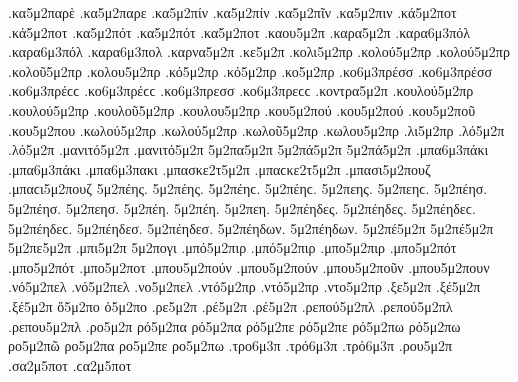 {.κα5μ2παρὲ 
.κα5μ2παρε 
.κα5μ2πίν .κα5μ2πίν   %
.κα5μ2πῖν 
.κα5μ2πιν 
.κά5μ2ποτ .κά5μ2ποτ   %
.κα5μ2πότ .κα5μ2πότ 
.κα5μ2ποτ 
.καου5μ2π   %
.καρα5μ2π   %
.καρα6μ3πόλ .καρα6μ3πόλ   %
.καρα6μ3πολ 
.καρνα5μ2π   %
.κε5μ2π   %
.κολι5μ2πρ   %
.κολού5μ2πρ .κολού5μ2πρ   %
.κολοῦ5μ2πρ 
.κολου5μ2πρ 
.κό5μ2πρ .κό5μ2πρ   %
.κο5μ2πρ 
.κο6μ3πρέσσ .κο6μ3πρέσσ .κο6μ3πρέϲϲ .κο6μ3πρέϲϲ   %
.κο6μ3πρεσσ .κο6μ3πρεϲϲ 
.κοντρα5μ2π   %
.κουλού5μ2πρ .κουλού5μ2πρ   %
.κουλοῦ5μ2πρ 
.κουλου5μ2πρ 
.κου5μ2πού .κου5μ2πού   %
.κου5μ2ποῦ 
.κου5μ2που 
.κωλού5μ2πρ .κωλού5μ2πρ   %
.κωλοῦ5μ2πρ 
.κωλου5μ2πρ 
.λι5μ2πρ   %
.λό5μ2π .λό5μ2π   %
.μανιτό5μ2π .μανιτό5μ2π   %
5μ2πα5μ2π   %
5μ2πά5μ2π 5μ2πά5μ2π   %
.μπα6μ3πάκι .μπα6μ3πάκι   %
.μπα6μ3πακι 
.μπασκε2τ5μ2π .μπαϲκε2τ5μ2π   %
.μπασι5μ2πουζ .μπαϲι5μ2πουζ   %
5μ2πέης. 5μ2πέης. 5μ2πέηϲ. 5μ2πέηϲ.   %
5μ2πεης. 5μ2πεηϲ. 
5μ2πέησ. 5μ2πέησ. 
5μ2πεησ. 
5μ2πέη. 5μ2πέη. 
5μ2πεη. 
5μ2πέηδες. 5μ2πέηδες. 5μ2πέηδεϲ. 5μ2πέηδεϲ. 
5μ2πέηδεσ. 5μ2πέηδεσ. 
5μ2πέηδων. 5μ2πέηδων. 
5μ2πέ5μ2π 5μ2πέ5μ2π   %
5μ2πε5μ2π 
.μπι5μ2π   %
5μ2πογι   %
.μπό5μ2πιρ .μπό5μ2πιρ   %
.μπο5μ2πιρ   %
.μπο5μ2πότ .μπο5μ2πότ   %
.μπο5μ2ποτ 
.μπου5μ2πούν .μπου5μ2πούν   %
.μπου5μ2ποῦν 
.μπου5μ2πουν 
.νό5μ2πελ .νό5μ2πελ   %
.νο5μ2πελ 
.ντό5μ2πρ .ντό5μ2πρ   %
.ντο5μ2πρ 
.ξε5μ2π   %
.ξέ5μ2π .ξέ5μ2π 
ὄ5μ2πο   %
ὀ5μ2πο 
.ρε5μ2π   %
.ρέ5μ2π .ρέ5μ2π   %
.ρεπού5μ2πλ .ρεπού5μ2πλ   %
.ρεπου5μ2πλ   %
.ρο5μ2π   %
ρό5μ2πα ρό5μ2πα   %
ρό5μ2πε ρό5μ2πε 
ρό5μ2πω ρό5μ2πω 
ρο5μ2πῶ 
ρο5μ2πα 
ρο5μ2πε 
ρο5μ2πω 
.τρο6μ3π   %
.τρό6μ3π .τρό6μ3π   %
.ρου5μ2π   %
.σα2μ5ποτ .ϲα2μ5ποτ   %
}
